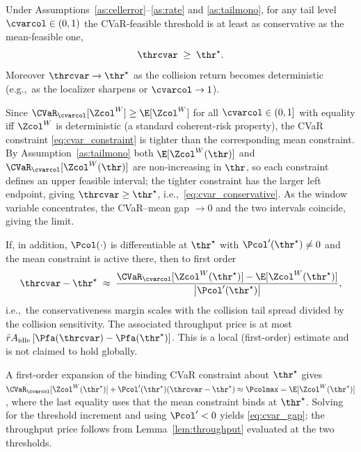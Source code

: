 \begin{theorem}
\label{thm:cvar}
Under Assumptions~\ref{as:cellerror}--\ref{as:rate} and
\ref{as:tailmono}, for any tail level $\cvarcol\in(0,1)$ the CVaR-feasible
threshold is at least as conservative as the mean-feasible one,
\begin{equation}
\thrcvar \;\ge\; \thr^{\star}.
\label{eq:cvar_conservative}
\end{equation}
Moreover $\thrcvar\to\thr^{\star}$ as the collision return becomes
deterministic (e.g.,\ as the localizer sharpens or $\cvarcol\to1$).
\end{theorem}

\begin{IEEEproof}
Since $\CVaR_{\cvarcol}[\Zcol^{W}]\ge\E[\Zcol^{W}]$ for all
$\cvarcol\in(0,1]$ with equality iff $\Zcol^{W}$ is deterministic (a standard
coherent-risk property), the CVaR constraint \eqref{eq:cvar_constraint} is
tighter than the corresponding mean constraint. By
Assumption~\ref{as:tailmono} both $\E[\Zcol^{W}(\thr)]$ and
$\CVaR_{\cvarcol}[\Zcol^{W}(\thr)]$ are non-increasing in $\thr$, so each
constraint defines an upper feasible interval; the tighter constraint has the
larger left endpoint, giving $\thrcvar\ge\thr^{\star}$, i.e.,~\eqref{eq:cvar_conservative}.
As the window variable concentrates, the
CVaR--mean gap $\to 0$ and the two intervals coincide, giving the limit.
\end{IEEEproof}

\begin{corollary}
\label{cor:cvargap}
If, in addition, $\Pcol(\cdot)$ is differentiable at $\thr^\star$ with
$\Pcol'(\thr^\star)\neq 0$ and the mean constraint is active there, then to
first order
\begin{equation}
\thrcvar-\thr^{\star}\;\approx\;
\frac{\CVaR_{\cvarcol}[\Zcol^{W}(\thr^{\star})]-\E[\Zcol^{W}(\thr^{\star})]}
{\bigl|\Pcol'(\thr^{\star})\bigr|},
\label{eq:cvar_gap}
\end{equation}
i.e.,\ the conservativeness margin scales with the collision tail spread
divided by the collision sensitivity. The associated throughput price is at
most $\bar r A_{\mathrm{idle}}\,[\Pfa(\thrcvar)-\Pfa(\thr^{\star})]$. This is
a local (first-order) estimate and is not claimed to hold globally.
\end{corollary}

\begin{IEEEproof}
A first-order expansion of the binding CVaR constraint about $\thr^{\star}$
gives $\CVaR_{\cvarcol}[\Zcol^{W}(\thr^{\star})]
+\Pcol'(\thr^{\star})(\thrcvar-\thr^{\star})\approx\Pcolmax
=\E[\Zcol^{W}(\thr^{\star})]$, where the last equality uses that the mean
constraint binds at $\thr^{\star}$. Solving for the threshold increment and
using $\Pcol'<0$ yields \eqref{eq:cvar_gap}; the throughput price follows
from Lemma~\ref{lem:throughput} evaluated at the two thresholds.
\end{IEEEproof}

